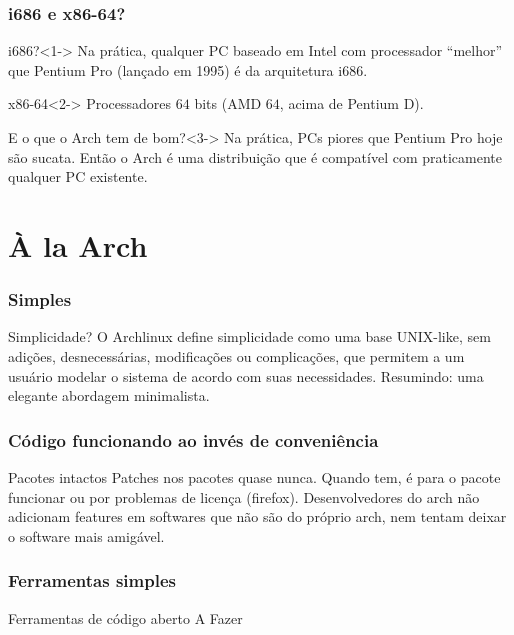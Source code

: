 \documentclass{beamer}
\begin{document}
\begin{frame}
    \frametitle{i686 e x86-64?}
    \begin{block}{i686?}<1->
        Na prática, qualquer PC baseado em Intel com processador ``melhor'' que Pentium Pro (lançado em 1995) é da arquitetura i686. 
    \end{block}
    \begin{block}{x86-64}<2->
        Processadores $64$ bits (AMD $64$, acima de Pentium D). 
    \end{block}
    \begin{block}{E o que o Arch tem de bom?}<3->
        Na prática, PCs piores que Pentium Pro hoje são sucata. Então o Arch é uma distribuição que é compatível com praticamente qualquer PC existente.
    \end{block}

\end{frame}

\section{À la Arch}

\begin{frame}
    \frametitle{Simples}
    \begin{block}{Simplicidade?}
        O Archlinux define simplicidade como uma base UNIX-like, sem adições,
        desnecessárias, modificações ou complicações, que permitem a um usuário modelar o sistema de acordo com suas 
        necessidades. Resumindo: uma elegante abordagem minimalista.
    \end{block}
\end{frame}


\begin{frame}
    \frametitle{Código funcionando ao invés de conveniência} 
    \begin{block}{Pacotes intactos}
        Patches nos pacotes quase nunca. Quando tem, é para o pacote funcionar ou por problemas de licença (firefox). Desenvolvedores do 
        arch não adicionam features em softwares que não são do próprio arch, nem tentam deixar o software mais amigável.
    \end{block}
\end{frame}

\begin{frame}
    \frametitle{Ferramentas simples}
    \begin{block}{Ferramentas de código aberto}
        A Fazer
    \end{block}
\end{frame}
\end{document}
